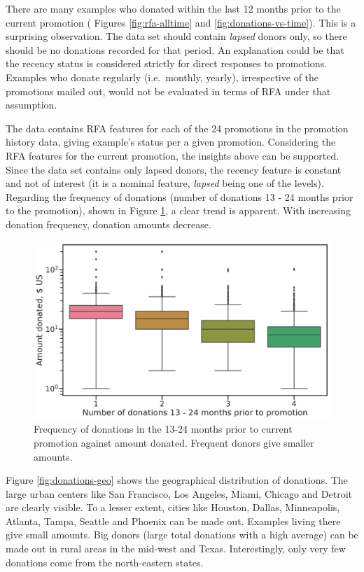 \documentclass[
  11pt,
  a4paper,
  DIV=12,captions=tableheading,oneside,titlepage]{scrbook}
\begin{document}
There are many examples who donated within the last 12 months prior to the current promotion ( Figures \ref{fig:rfa-alltime} and \ref{fig:donations-vs-time}). This is a surprising observation. The data set should contain \emph{lapsed} donors only, so there should be no donations recorded for that period. An explanation could be that the recency status is considered strictly for direct responses to promotions. Examples who donate regularly (i.e.~monthly, yearly), irrespective of the promotions mailed out, would not be evaluated in terms of RFA under that assumption.

The data contains RFA features for each of the 24 promotions in the promotion history data, giving example's status per a given promotion. Considering the RFA features for the current promotion, the insights above can be supported. Since the data set contains only lapsed donors, the recency feature is constant and not of interest (it is a nominal feature, \emph{lapsed} being one of the levels). Regarding the frequency of donations (number of donations 13 - 24 months prior to the promotion), shown in Figure \ref{fig:rfa-f}, a clear trend is apparent. With increasing donation frequency, donation amounts decrease.

\begin{figure}

{\centering \includegraphics[width=0.7\linewidth]{figures/eda/frequency-past-donatios-vs-donations} 

}

\caption{Frequency of donations in the 13-24 months prior to current promotion against amount donated. Frequent donors give smaller amounts.}\label{fig:rfa-f}
\end{figure}

Figure \ref{fig:donations-geo} shows the geographical distribution of donations. The large urban centers like San Francisco, Los Angeles, Miami, Chicago and Detroit are clearly visible. To a lesser extent, cities like Houston, Dallas, Minneapolis, Atlanta, Tampa, Seattle and Phoenix can be made out. Examples living there give small amounts. Big donors (large total donations with a high average) can be made out in rural areas in the mid-west and Texas. Interestingly, only very few donations come from the north-eastern states.
\end{document}
